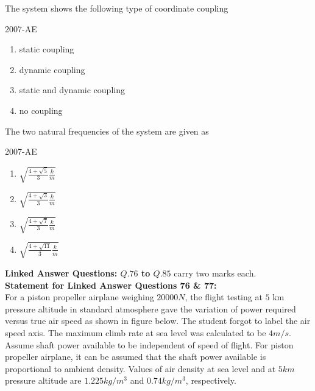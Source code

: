 \item The system shows the following type of coordinate coupling

\hfill{2007-AE}

\begin{enumerate}
    \item static coupling
    \item dynamic coupling
    \item static and dynamic coupling
    \item no coupling\\
\end{enumerate}
\item The two natural frequencies of the system are given as

\hfill{2007-AE}

\begin{enumerate}
    \item $\sqrt{\frac{4+\sqrt{5}}{3}\frac{k}{m}}$
    \item $\sqrt{\frac{4+\sqrt{3}}{3}\frac{k}{m}}$
    \item $\sqrt{\frac{4+\sqrt{7}}{3}\frac{k}{m}}$
    \item $\sqrt{\frac{4+\sqrt{11}}{3}\frac{k}{m}}$
\end{enumerate}
\textbf{Linked Answer Questions: $Q.76$ to $Q.85$} carry two marks each.\\
\textbf{Statement for Linked Answer Questions 76 \& 77:}\\
For a piston propeller airplane weighing $20000 N$, the flight testing at $5$ km pressure altitude in standard atmosphere gave the variation of power required versus true air speed as shown in figure below. The student forgot to label the air speed axis. The maximum climb rate at sea level was calculated to be $4 m/s$. Assume shaft power available to be independent of speed of flight. For piston propeller airplane, it can be assumed that the shaft power available is proportional to ambient density. Values of air density at sea level and at $5 km$ pressure altitude are $1.225 kg/m^3$ and $0.74 kg/m^3$, respectively.



